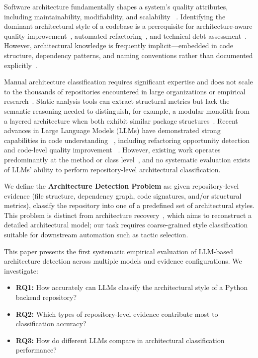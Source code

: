\documentclass[runningheads]{llncs}
\begin{document}
Software architecture fundamentally shapes a system's quality attributes, including maintainability, modifiability, and scalability~\cite{bass2021software} \cite{perry1992foundations}. Identifying the dominant architectural style of a codebase is a prerequisite for architecture-aware quality improvement~\cite{marquez2022architectural}, automated refactoring~\cite{martinez2025refactoring}, and technical debt assessment~\cite{bogner2019modifiability}. However, architectural knowledge is frequently implicit---embedded in code structure, dependency patterns, and naming conventions rather than documented explicitly~\cite{garlan1993introduction}.

Manual architecture classification requires significant expertise and does not scale to the thousands of repositories encountered in large organizations or empirical research~\cite{esposito2025generative}. Static analysis tools can extract structural metrics but lack the semantic reasoning needed to distinguish, for example, a modular monolith from a layered architecture when both exhibit similar package structures~\cite{lenarduzzi2023critical}. Recent advances in Large Language Models (LLMs) have demonstrated strong capabilities in code understanding~\cite{liu2025exploring} \cite{piao2025refactoring}, including refactoring opportunity detection~\cite{martinez2025refactoring} \cite{horikawa2025agentic} and code-level quality improvement~ \cite{xu2025mantra}. However, existing work operates predominantly at the method or class level~\cite{horikawa2025agentic}, and no systematic evaluation exists of LLMs' ability to perform repository-level architectural classification.

We define the \textbf{Architecture Detection Problem} as: given repository-level evidence (file structure, dependency graph, code signatures, and/or structural metrics), classify the repository into one of a predefined set of architectural styles. This problem is distinct from architecture recovery~\cite{shokri2024ipsynth}, which aims to reconstruct a detailed architectural model; our task requires coarse-grained style classification suitable for downstream automation such as tactic selection.

This paper presents the first systematic empirical evaluation of LLM-based architecture detection across multiple models and evidence configurations. We investigate:

\begin{itemize}[nosep]
    \item \textbf{RQ1:} How accurately can LLMs classify the architectural style of a Python backend repository?
    \item \textbf{RQ2:} Which types of repository-level evidence contribute most to classification accuracy?
    \item \textbf{RQ3:} How do different LLMs compare in architectural classification performance?
\end{itemize}
\end{document}
